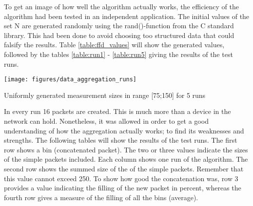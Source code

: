 To get an image of how well the algorithm actually works, the efficiency of the algorithm had been tested in an independent application. The initial values of the set N are generated randomly using the rand()-function from the C standard library. This had been done to avoid choosing too structured data that could falsify the results. Table \ref{table:ffd_values} will show the generated values, followed by the tables \ref{table:run1} - \ref{table:run5} giving the results of the test runs.


\begin{table}
\texttt{[image: figures/data\_aggregation\_runs]}
\caption{Uniformly generated measurement sizes in range [75;150] for 5 runs}
\label{table:ffd_values}
\end{table}

In every run 16 packets are created. This is much more than a device in the network can hold. Nonetheless, it was allowed in order to get a good understanding of how the aggregation actually works; to find its weaknesses and strengths. The following tables will show the results of the test runs. The first row shows a bin (concatenated packet). The two or three values indicate the sizes of the simple packets included. Each column shows one run of the algorithm. The second row shows the summed size of the of the simple packets. Remember that this value cannot exceed 250. To show how good the concatenation was, row 3 provides a value indicating the filling of the new packet in percent, whereas the fourth row gives a measure of the filling of all the bins (average).

